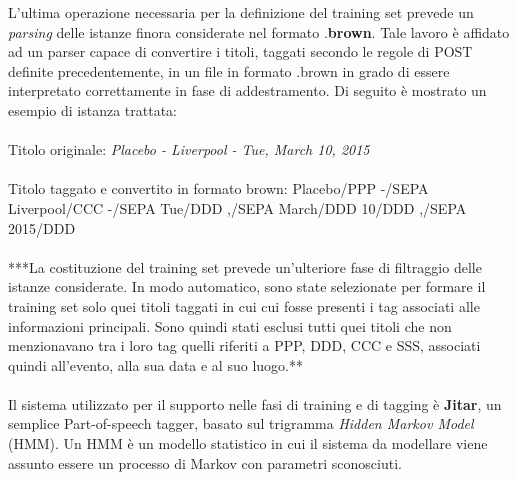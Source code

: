\documentclass[a4paper]{report}
\begin{document}
L'ultima operazione necessaria per la definizione del training set prevede un \textit{parsing} delle istanze finora considerate nel formato .\textbf{brown}\cite{8}. Tale lavoro è affidato ad un parser capace di convertire i titoli, taggati secondo le regole di POST definite precedentemente, in un file in formato .brown in grado di essere interpretato correttamente in fase di addestramento. Di seguito è mostrato un esempio di istanza trattata: \\ \\
Titolo originale: \textit{Placebo - Liverpool - Tue, March 10, 2015} \\ \\
Titolo taggato e convertito in formato brown: Placebo/PPP -/SEPA Liverpool/CCC -/SEPA Tue/DDD ,/SEPA March/DDD 10/DDD ,/SEPA 2015/DDD \\ \\
***La costituzione del training set prevede un'ulteriore fase di filtraggio delle istanze considerate. In modo automatico, sono state selezionate per formare il training set solo quei titoli taggati in cui cui fosse presenti i tag associati alle informazioni principali. Sono quindi stati esclusi tutti quei titoli che non menzionavano tra i loro tag quelli riferiti a PPP, DDD, CCC e SSS, associati quindi all'evento, alla sua data e al suo luogo.** \\ \\
Il sistema utilizzato per il supporto nelle fasi di training e di tagging è \textbf{Jitar}\cite{9}, un semplice Part-of-speech tagger, basato sul trigramma \textit{Hidden Markov Model} (HMM). Un HMM è un modello statistico in cui il sistema da modellare viene assunto essere un processo di Markov con parametri sconosciuti. 
\end{document}
